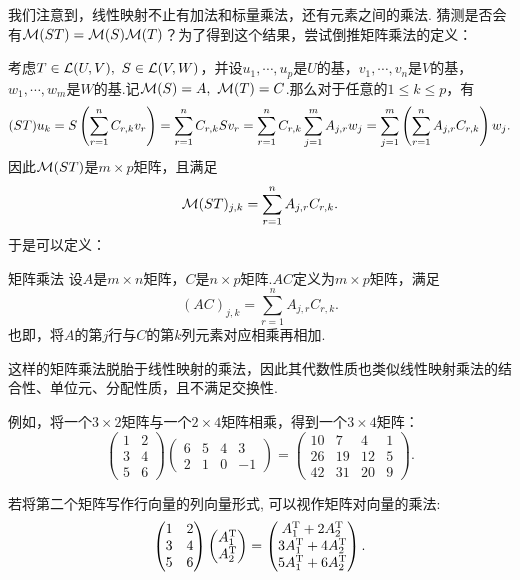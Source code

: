 我们注意到，线性映射不止有加法和标量乘法，还有元素之间的乘法. 猜测是否会有$\mathcal{M} (ST)= \mathcal{M} (S) \mathcal{M} (T)$？为了得到这个结果，尝试倒推矩阵乘法的定义：

考虑$T \in \mathcal{L} (U,V),~S \in \mathcal{L} (V,W)$，并设$u_1, \cdots ,u_p$是$U$的基，$v_1, \cdots ,v_n$是$V$的基，$w_1, \cdots ,w_m$是$W$的基.记$\mathcal{M} (S)=A,~\mathcal{M} (T)=C$.那么对于任意的$1 \leq k \leq p$，有$$(ST)u_k = S\left( \sum_{r=1}^{n} C_{r,k}v_r \right) = \sum_{r=1}^{n} C_{r,k}Sv_r = \sum_{r=1}^{n} C_{r,k} \sum_{j=1}^{m} A_{j,r}w_j = \sum_{j=1}^{m} \left( \sum_{r=1}^{n} A_{j,r} C_{r,k} \right) w_j.$$
因此$\mathcal{M} (ST)$是$m \times p$矩阵，且满足$$\mathcal{M} (ST)_{j,k} = \sum_{r=1}^{n} A_{j,r} C_{r,k}.$$
于是可以定义：

\begin{definition}{矩阵乘法}
	设$A$是$m \times n$矩阵，$C$是$n \times p$矩阵.$AC$定义为$m \times p$矩阵，满足$$(AC)_{j,k} = \sum_{r=1}^{n} A_{j,r} C_{r,k}.$$
	也即，将$A$的第$j$行与$C$的第$k$列元素对应相乘再相加.
\end{definition}

这样的矩阵乘法脱胎于线性映射的乘法，因此其代数性质也类似线性映射乘法的结合性、单位元、分配性质，且不满足交换性.

例如，将一个$3 \times 2$矩阵与一个$2 \times 4$矩阵相乘，得到一个$3 \times 4$矩阵：$$\begin{pmatrix}
	1 & 2 \\ 3 & 4 \\ 5 & 6
\end{pmatrix} \begin{pmatrix}
	6 & 5 & 4 & 3 \\ 2 & 1 & 0 & -1
\end{pmatrix} = \begin{pmatrix}
	10 & 7 & 4 & 1 \\ 26 & 19 & 12 & 5 \\ 42 & 31 & 20 & 9
\end{pmatrix}.$$

若将第二个矩阵写作行向量的列向量形式, 可以视作矩阵对向量的乘法: $$\begin{pmatrix}
	1 & 2 \\ 3 & 4 \\ 5 & 6
\end{pmatrix} \begin{pmatrix}
	A_1^{\operatorname{T}} \\ A_2^{\operatorname{T}}
\end{pmatrix} = \begin{pmatrix}
	A_1^{\operatorname{T}}+2A_2^{\operatorname{T}} \\ 3A_1^{\operatorname{T}}+4A_2^{\operatorname{T}} \\ 5A_1^{\operatorname{T}}+6A_2^{\operatorname{T}}
\end{pmatrix}.$$

